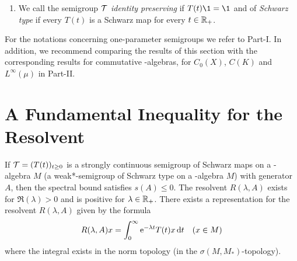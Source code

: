 \begin{enumerate}[1., wide, labelsep=1em]
\item
We call the semigroup $ \mathcal{T} $ \emph{identity preserving} if\/ $ T(t)\1 = \1 $ and of \emph{Schwarz type} if every $ T(t) $ is a Schwarz map for every $t \in \mathbb{R}_{+}$.

\end{enumerate}
For the notations concerning one-parameter semigroups we refer to Part-I.
In addition, we recommend comparing the results of this section with the corresponding results for commutative \CA-algebras, \ie for $ C_{0}(X) $, $ C(K) $ and $ L^\infty(\mu) $ in Part-II.
\section{A Fundamental Inequality for the Resolvent}\label{sec:d1-2}
If\/ $ \TT = (T(t))_{t \geq 0} $ is a strongly continuous semigroup of Schwarz maps on a \CA-algebra $ M $ (\resp a weak*-semigroup of Schwarz type on a \WA-algebra $ M $) with generator $ A $, then the spectral bound satisfies $ s(A) \leq 0 $.
The resolvent $ R(\lambda, A) $ exists for $ \Re(\lambda) > 0 $ and is positive for $ \lambda \in \mathbb{R}_{+} $.
There exists a representation for the resolvent $ R(\lambda,A) $ given by the formula
\[
 	R(\lambda,A)x = \int_{0}^\infty \mathrm{e}^{-\lambda t} T(t)x  \mathop{}\!\mathrm{d}{t}  \quad (x \in M)
\]
where the integral exists in the norm topology (\resp in the $\sigma(M,M_{*})$-topology).

